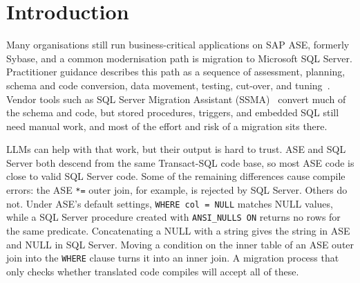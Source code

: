 \section{Introduction}\label{sec:intro}

Many organisations still run business-critical applications on SAP ASE, formerly Sybase, and a common
modernisation path is migration to Microsoft SQL Server. Practitioner guidance describes this path as a
sequence of assessment, planning, schema and code conversion, data movement, testing, cut-over, and
tuning~\cite{manda2026}. Vendor tools such as SQL Server Migration Assistant (SSMA)~\cite{ssma} convert
much of the schema and code, but stored procedures, triggers, and embedded SQL still need manual work, and
most of the effort and risk of a migration sits there.

LLMs can help with that work, but their output is hard to trust. ASE and SQL Server both descend from the
same Transact-SQL code base, so most ASE code is close to valid SQL Server code. Some of the remaining
differences cause compile errors: the ASE \texttt{*=} outer join, for example, is rejected by SQL Server.
Others do not. Under ASE's default settings, \texttt{WHERE col = NULL} matches NULL values, while a SQL
Server procedure created with \texttt{ANSI\_NULLS ON} returns no rows for the same predicate. Concatenating
a NULL with a string gives the string in ASE and NULL in SQL Server. Moving a condition on the inner table
of an ASE outer join into the \texttt{WHERE} clause turns it into an inner join. A migration process that
only checks whether translated code compiles will accept all of these.

